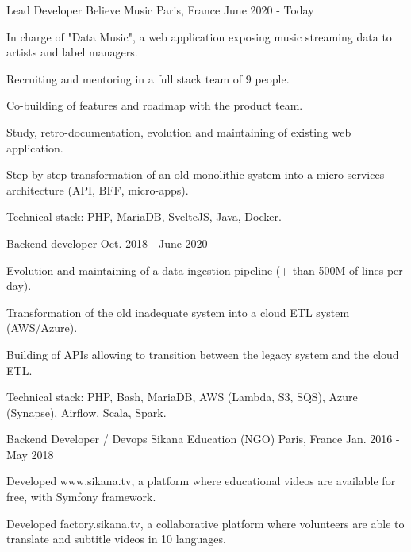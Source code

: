 \begin{cventries}
  \cventry
    {Lead Developer}
    {Believe Music}
    {Paris, France}
    {June 2020 - Today}
    {
      \begin{cvitems}
        \item {In charge of "Data Music", a web application exposing music streaming data to artists and label managers.}
        \item {Recruiting and mentoring in a full stack team of 9 people.}
        \item {Co-building of features and roadmap with the product team.}
        \item {Study, retro-documentation, evolution and maintaining of existing web application.}
        \item {Step by step transformation of an old monolithic system into a micro-services architecture (API, BFF, micro-apps).}
        \item {Technical stack: PHP, MariaDB, SvelteJS, Java, Docker.}
      \end{cvitems}
      \vspace{-2.0mm}
    }
  \cventry
    {Backend developer}
    {}
    {}
    {Oct. 2018 - June 2020}
    {
      \begin{cvitems}
        \item {Evolution and maintaining of a data ingestion pipeline (+ than 500M of lines per day).}
        \item {Transformation of the old inadequate system into a cloud ETL system (AWS/Azure).}
        \item {Building of APIs allowing to transition between the legacy system and the cloud ETL.}
        \item {Technical stack: PHP, Bash, MariaDB, AWS (Lambda, S3, SQS), Azure (Synapse), Airflow, Scala, Spark.}
      \end{cvitems}
    }
  \cventry
    {Backend Developer / Devops}
    {Sikana Education (NGO)}
    {Paris, France}
    {Jan. 2016 - May 2018}
    {
      \begin{cvitems}
        \item {Developed www.sikana.tv, a platform where educational videos are available for free, with Symfony framework.}
        \item {Developed factory.sikana.tv, a collaborative platform where volunteers are able to translate and subtitle videos in 10 languages.}

\end{cvitems}}
\end{cventries}
